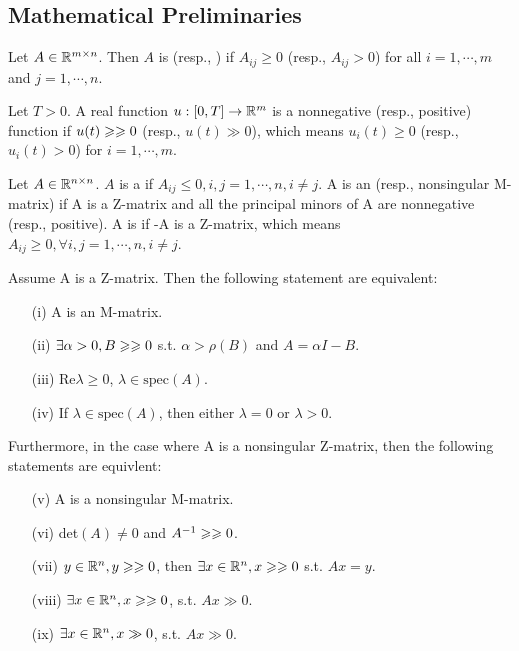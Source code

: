 \documentclass{paper}
\begin{document}
\subsection{Mathematical Preliminaries}
\begin{defi}
Let $A\in \mathbb{R}^{m\times n}$. Then $A$ is  (resp., ) if $A_{ij}\geqslant 0$ (resp.,
$A_{ij}>0$) for all $i=1,\cdots,m$ and $j=1,\cdots,n$.
\end{defi}
\begin{defi}
Let $T>0$. A real function ${u}:{[0,T]}\rightarrow{\mathbb{R}^{m}}$ is a nonnegative (resp., positive) function if
$u(t)\geqslant\geqslant 0$ (resp., $u(t)\gg 0$), which means $u_i(t)\geqslant 0$ (resp., $u_i(t)>0$) for $i=1,\cdots,m$.
\end{defi}
\begin{defi}
Let $A\in \mathbb{R}^{n\times n}$. $A$ is a  if $A_{ij}\leqslant 0,i,j=1,\cdots,n,i\neq j$. A is an
 (resp., nonsingular M-matrix) if A is a Z-matrix and all the principal minors of A are
nonnegative (resp., positive). A is  if -A is a Z-matrix, which means
$A_{ij}\geqslant 0,\forall i,j=1,\cdots,n,i\neq j$.
\end{defi}
\begin{lem} \label{lem1}
Assume A is a Z-matrix. Then the following statement are equivalent:
\begin{enumerate}
\item[(i)]    A is an M-matrix.
\item[(ii)]   $\exists \alpha>0, B\geqslant\geqslant 0$ s.t. $\alpha > \rho(B)$ and $A=\alpha I-B$.
\item[(iii)]  Re$\lambda\geq 0$, $\lambda\in \mathrm{spec}(A)$.
\item[(iv)]   If $\lambda\in \mathrm{spec}(A)$, then either $\lambda=0$ or $\lambda>0$.
\end{enumerate}
Furthermore, in the case where A is a nonsingular Z-matrix, then the following statements are equivlent:
\begin{enumerate}
\item[(v)]    A is a nonsingular M-matrix.
\item[(vi)]   det$(A)\neq0$ and $A^{-1}\geqslant\geqslant 0$.
\item[(vii)]  $y\in\mathbb{R}^{n},y\geqslant\geqslant 0$, then $\exists x\in\mathbb{R}^{n},x\geqslant\geqslant 0$ s.t. $Ax=y$.
\item[(viii)] $\exists x\in\mathbb{R}^{n},x\geqslant\geqslant 0$, s.t. $Ax\gg 0$.
\item[(ix)]   $\exists x\in\mathbb{R}^{n},x\gg 0$, s.t. $Ax\gg 0$.
\end{enumerate}
\end{lem}
\end{document}
